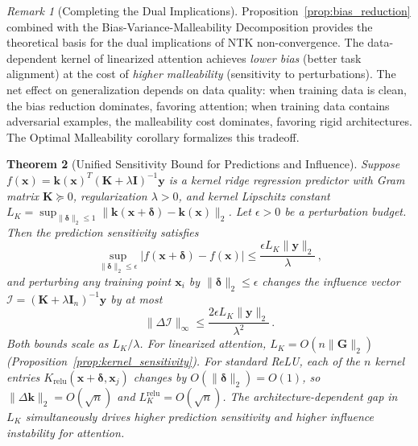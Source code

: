 \documentclass{article}
\theoremstyle{plain}
\newtheorem{theorem}{Theorem}[section]
\theoremstyle{definition}
\theoremstyle{remark}
\newtheorem{remark}[theorem]{Remark}
\begin{document}
\begin{remark}[Completing the Dual Implications]
\label{rmk:dual_complete}
Proposition~\ref{prop:bias_reduction} combined with the Bias-Variance-Malleability Decomposition provides the theoretical basis for the dual implications of NTK non-convergence. The data-dependent kernel of linearized attention achieves \emph{lower bias} (better task alignment) at the cost of \emph{higher malleability} (sensitivity to perturbations). The net effect on generalization depends on data quality: when training data is clean, the bias reduction dominates, favoring attention; when training data contains adversarial examples, the malleability cost dominates, favoring rigid architectures. The Optimal Malleability corollary formalizes this tradeoff.
\end{remark}

\begin{theorem}[Unified Sensitivity Bound for Predictions and Influence]
\label{thm:tradeoff}
Suppose $f(\mathbf{x}) = \mathbf{k}(\mathbf{x})^T(\mathbf{K} + \lambda\mathbf{I})^{-1}\mathbf{y}$ is a kernel ridge regression predictor with Gram matrix $\mathbf{K} \succeq 0$, regularization $\lambda > 0$, and kernel Lipschitz constant $L_K = \sup_{\|\boldsymbol{\delta}\|_2 \leq 1} \|\mathbf{k}(\mathbf{x}+\boldsymbol{\delta}) - \mathbf{k}(\mathbf{x})\|_2$. Let $\epsilon > 0$ be a perturbation budget. Then the prediction sensitivity satisfies
$$\sup_{\|\boldsymbol{\delta}\|_2 \leq \epsilon} |f(\mathbf{x}+\boldsymbol{\delta}) - f(\mathbf{x})| \leq \frac{\epsilon L_K \|\mathbf{y}\|_2}{\lambda}\,,$$
and perturbing any training point $\mathbf{x}_i$ by $\|\boldsymbol{\delta}\|_2 \leq \epsilon$ changes the influence vector $\boldsymbol{\mathcal{I}} = (\mathbf{K}+\lambda\mathbf{I}_n)^{-1}\mathbf{y}$ by at most
$$\|\Delta \boldsymbol{\mathcal{I}}\|_\infty \leq \frac{2\epsilon L_K \|\mathbf{y}\|_2}{\lambda^2}\,.$$
Both bounds scale as $L_K/\lambda$. For linearized attention, $L_K = O(n\|\mathbf{G}\|_2)$ (Proposition~\ref{prop:kernel_sensitivity}). For standard ReLU, each of the $n$ kernel entries $K_{\mathrm{relu}}(\mathbf{x}+\boldsymbol{\delta}, \mathbf{x}_j)$ changes by $O(\|\boldsymbol{\delta}\|_2) = O(1)$, so $\|\Delta\mathbf{k}\|_2 = O(\sqrt{n})$ and $L_K^{\mathrm{relu}} = O(\sqrt{n})$. The architecture-dependent gap in $L_K$ simultaneously drives higher prediction sensitivity and higher influence instability for attention.
\end{theorem}
\end{document}
